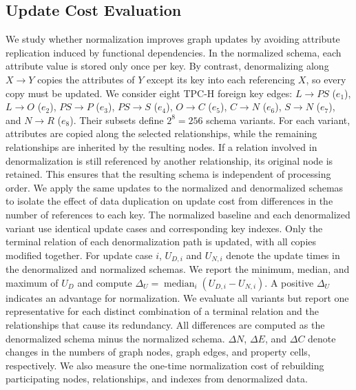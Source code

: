 \documentclass[sigconf]{acmart}
\begin{document}
\subsection{Update Cost Evaluation}
We study whether normalization improves graph updates by avoiding attribute
replication induced by functional dependencies. In the normalized schema, each
attribute value is stored only once per key. By contrast, denormalizing along
$X\rightarrow Y$ copies the attributes of $Y$ except its key into each
referencing $X$, so every copy must be updated. We consider eight TPC-H foreign
key edges: $L\rightarrow PS$
($e_1$), $L\rightarrow O$ ($e_2$), $PS\rightarrow P$ ($e_3$),
$PS\rightarrow S$ ($e_4$), $O\rightarrow C$ ($e_5$), $C\rightarrow N$
($e_6$), $S\rightarrow N$ ($e_7$), and $N\rightarrow R$ ($e_8$). Their
subsets define $2^8=256$ schema variants. For each variant, attributes are
copied along the selected relationships, while the remaining relationships are
inherited by the resulting nodes. If a relation involved in denormalization is
still referenced by another relationship, its original node is retained. This
ensures that the resulting
schema is independent of processing order. We apply the same updates to the
normalized and denormalized schemas to isolate the effect of data duplication
on update cost from differences in the number of references to each key. The
normalized baseline and each denormalized variant use identical update cases
and corresponding key indexes. Only the terminal relation of each
denormalization path is updated, with all copies modified together. For update
case $i$, $U_{D,i}$ and $U_{N,i}$ denote the update times in the denormalized
and normalized schemas.
We report the minimum, median, and maximum of $U_D$ and compute
$\Delta_U=\operatorname{median}_i(U_{D,i}-U_{N,i})$. A positive
$\Delta_U$ indicates an advantage for normalization. We evaluate all variants
but report one representative for each distinct combination of a terminal
relation and the relationships that cause its redundancy. All differences are
computed as the denormalized schema minus the normalized schema. $\Delta N$,
$\Delta E$, and $\Delta C$ denote changes in the numbers of graph nodes, graph
edges, and property cells, respectively. We also measure the one-time
normalization cost of rebuilding participating nodes, relationships, and indexes
from denormalized data.
\end{document}
